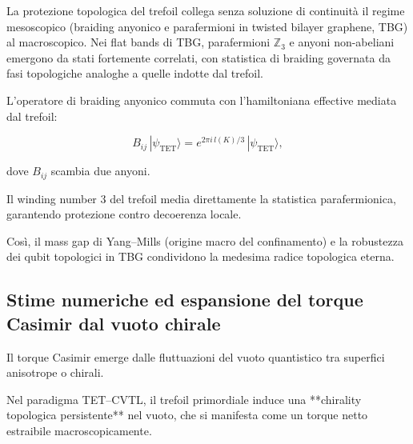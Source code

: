 \documentclass[11pt,a4paper]{article}
\theoremstyle{plain}
\theoremstyle{definition}
\begin{document}
\vspace{0.2cm}

La protezione topologica del trefoil collega senza soluzione di continuità il regime mesoscopico (braiding anyonico e parafermioni in twisted bilayer graphene, TBG) al macroscopico. Nei flat bands di TBG, parafermioni \(\mathbb{Z}_3\) e anyoni non-abeliani emergono da stati fortemente correlati, con statistica di braiding governata da fasi topologiche analoghe a quelle indotte dal trefoil.

\vspace{0.2cm}

L'operatore di braiding anyonico commuta con l'hamiltoniana effective mediata dal trefoil:

\begin{equation}
B_{ij} \, |\psi_{\text{TET}}\rangle = e^{2\pi i \, l(K)/3} \, |\psi_{\text{TET}}\rangle,
\label{eq:braiding}
\end{equation}

\vspace{0.2cm}

dove \(B_{ij}\) scambia due anyoni. 


\vspace{0.2cm}


Il winding number 3 del trefoil media direttamente la statistica parafermionica, garantendo protezione contro decoerenza locale. 

\vspace{0.2cm}

Così, il mass gap di Yang--Mills (origine macro del confinamento) e la robustezza dei qubit topologici in TBG condividono la medesima radice topologica eterna.


\vspace{0.5cm}

\subsection{Stime numeriche ed espansione del torque Casimir dal vuoto chirale}

\vspace{0.2cm}

Il torque Casimir emerge dalle fluttuazioni del vuoto quantistico tra superfici anisotrope o chirali. 


\vspace{0.2cm}



Nel paradigma TET--CVTL, il trefoil primordiale induce una **chirality topologica persistente** nel vuoto, che si manifesta come un torque netto estraibile macroscopicamente. 
\end{document}

